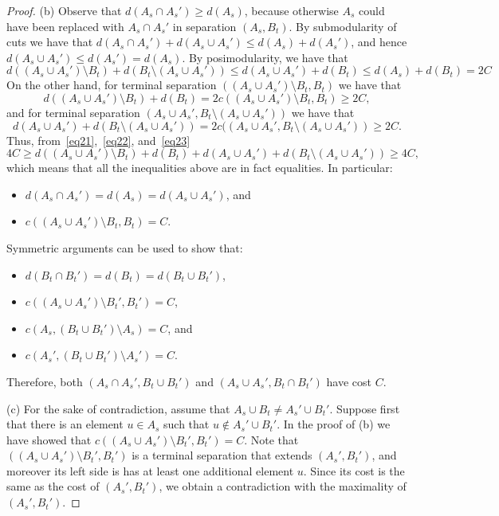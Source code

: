 \begin{proof}
\noindent (b) Observe that $d(A_s\cap A_s')\geq d(A_s)$, because otherwise $A_s$ could have been replaced with $A_s\cap A_s'$ in separation $(A_s,B_t)$. By submodularity of cuts we have that $d(A_s\cap A_s')+d(A_s\cup A_s')\leq d(A_s)+d(A_s')$, and hence $d(A_s\cup A_s')\leq d(A_s')=d(A_s)$. By posimodularity, we have that
\begin{equation}\label{eq21}
d((A_s\cup A_s') \setminus B_t)+d(B_t\setminus (A_s\cup A_s'))\leq d(A_s\cup A_s')+d(B_t)\leq d(A_s)+d(B_t)=2C
\end{equation}
On the other hand, for terminal separation $((A_s\cup A_s') \setminus B_t,B_t)$ we have that
\begin{equation}\label{eq22}
d((A_s\cup A_s') \setminus B_t)+d(B_t) = 2c((A_s\cup A_s') \setminus B_t,B_t) \geq 2C,
\end{equation}
and for terminal separation $(A_s\cup A_s',B_t\setminus (A_s\cup A_s'))$ we have that
\begin{equation}\label{eq23}
d(A_s\cup A_s')+d(B_t\setminus (A_s\cup A_s')) = 2c((A_s\cup A_s',B_t\setminus (A_s\cup A_s')) \geq 2C.
\end{equation}
Thus, from~\eqref{eq21},~\eqref{eq22}, and~\eqref{eq23}
$$4C\geq d((A_s\cup A_s') \setminus B_t)+d(B_t)+d(A_s\cup A_s')+d(B_t\setminus (A_s\cup A_s'))\geq 4C,$$
which means that all the inequalities above are in fact equalities. In particular:
\begin{itemize}
\item $d(A_s\cap A_s')=d(A_s)=d(A_s\cup A_s')$, and 
\item $c((A_s\cup A_s') \setminus B_t,B_t)=C$.
\end{itemize} 
Symmetric arguments can be used to show that:
\begin{itemize}
\item $d(B_t\cap B_t') = d(B_t)=d(B_t\cup B_t')$, 
\item $c((A_s\cup A_s') \setminus B_t',B_t')=C$, 
\item $c(A_s,(B_t\cup B_t')\setminus A_s)=C$, and
\item $c(A_s',(B_t\cup B_t')\setminus A_s')=C$.
\end{itemize}
Therefore, both $(A_s\cap A_s',B_t\cup B_t')$ and $(A_s\cup A_s',B_t\cap B_t')$ have cost $C$.

\smallskip

\noindent (c) For the sake of contradiction, assume that $A_s\cup B_t\neq A_s'\cup B_t'$. Suppose first that there is an element $u\in A_s$ such that $u\notin A_s'\cup B_t'$. In the proof of (b) we have showed that $c((A_s\cup A_s') \setminus B_t',B_t')=C$. Note that $((A_s\cup A_s') \setminus B_t',B_t')$ is a terminal separation that extends $(A_s',B_t')$, and moreover its left side is has at least one additional element $u$. Since its cost is the same as the cost of $(A_s',B_t')$, we obtain a contradiction with the maximality of $(A_s',B_t')$.
\end{proof}

